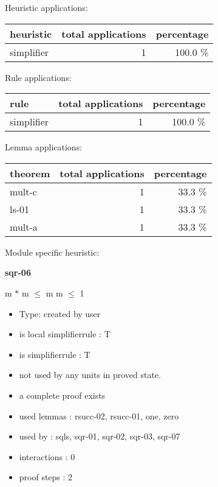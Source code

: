 \documentclass[a4paper]{article}
\begin{document}
\medskip


Heuristic applications:

\begin{supertabular}{l|r|r}
heuristic	& total applications & percentage \\ \hline
simplifier & 1 & 100.0 \% \\

\end{supertabular}

Rule applications:

\begin{supertabular}{l|r|r}
rule	        & total applications & percentage \\ \hline
simplifier & 1 & 100.0 \% \\

\end{supertabular}

Lemma applications:

\begin{supertabular}{l|r|r}
theorem	        & total applications & percentage \\ \hline
mult-c & 1 & 33.3 \% \\
ls-01 & 1 & 33.3 \% \\
mult-a & 1 & 33.3 \% \\

\end{supertabular}

Module specific heuristic:

\pagebreak

{\LARGE\bf sqr-06}\label{lemma-sqr-06}

\medskip

 \Fol m $*$ m $\le$ m \Equiv m $\le$ 1

\begin{itemize}

\item Type: created by user

\item is local simplifierrule : T
\item is simplifierrule : T
\item not used by any units in proved state.
\item       a complete proof exists
\item       used lemmas  : rsucc-02, rsucc-01, one, zero
\item       used by      : sqls, sqr-01, sqr-02, sqr-03, sqr-07
\item       interactions : 0
\item       proof steps  : 2
\end{itemize}
\end{document}
